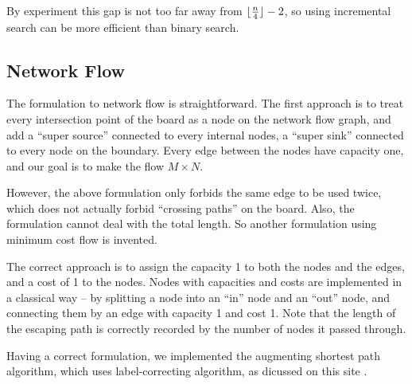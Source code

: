\documentclass{article}
\DeclarePairedDelimiter\floor{\lfloor}{\rfloor}
\begin{document}
\begin{spacing}{1.1}
    By experiment this gap is not too far away from $\floor{\frac{n}{4}} - 2$, so using incremental search can be more efficient than binary search.
    \label{RA}
    \subsection{Network Flow}
    The formulation to network flow is straightforward. The first approach is to treat every intersection point of the board as a node on the network flow graph, and add a ``super source'' connected to every internal nodes, a ``super sink'' connected to every
    node on the boundary. Every edge between the nodes have capacity one, and our goal is to make the flow $M \times N$.

    However, the above formulation only forbids the same edge to be used twice, which does not actually forbid ``crossing paths'' on the board. Also, the formulation cannot deal with the total length. So another formulation using minimum cost flow is invented.

    The correct approach is to assign the capacity 1 to both the nodes and the edges, and a cost of 1 to the nodes. Nodes with capacities and costs are implemented in a classical way -- by splitting a node into an ``in'' node and an ``out'' node, and connecting them by
    an edge with capacity 1 and cost 1. Note that the length of the escaping path is correctly recorded by the number of nodes it passed through.

    Having a correct formulation, we implemented the augmenting shortest path algorithm, which uses label-correcting algorithm, as dicussed on this site \cite{FLOW}.


\end{spacing}
\end{document}
